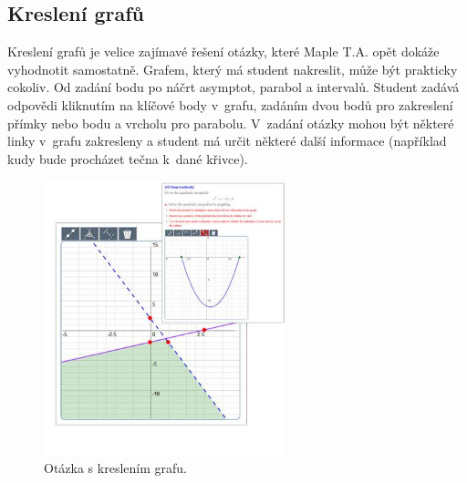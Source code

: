 \documentclass[
print,
  11pt,
  table,   
  nolof,    
  nolot,
  oneside,
  draft
]{fithesis3}
\begin{document}
	\subsection{Kreslení grafů}
Kreslení grafů je velice zajímavé řešení otázky, které Maple T.A. opět dokáže vyhodnotit samostatně. Grafem, který má student nakreslit, může být prakticky cokoliv. Od zadání bodu po náčrt asymptot, parabol a intervalů. Student zadává odpovědi kliknutím na klíčové body v~grafu, zadáním dvou bodů pro zakreslení přímky nebo bodu a vrcholu pro parabolu. V~zadání otázky mohou být některé linky v~grafu zakresleny a student má určit některé další informace (například kudy bude procházet tečna k~dané křivce). 
		\begin{figure}[hbt]
		  \begin{center}
		    \includegraphics[width=70mm]{images/MapleTA_graph.png}
		   \end{center}
		  \caption{Otázka s kreslením grafu.  \cite{maple-questions}}
		  \label{fig:maplegraph}
		\end{figure}
\end{document}
